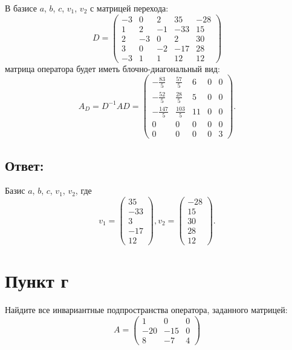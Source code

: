 \documentclass[12pt]{article}
\begin{document}
    В базисе $a$, $b$, $c$, $v_1$, $v_2$ с матрицей перехода:
    \[
        D
        =
        \begin{pmatrix}
            -3 & 0  & 2  & 35  & -28 \\
            1  & 2  & -1 & -33 & 15  \\
            2  & -3 & 0  & 2   & 30  \\
            3  & 0  & -2 & -17 & 28  \\
            -3 & 1  & 1  & 12  & 12
        \end{pmatrix}
    \]
    матрица оператора будет иметь блочно-диагональный вид:
    \[
        A_D
        = D^{-1} A D
        =
        \begin{pmatrix}
            - \frac{83}{5}  & \frac{57}{5}  & 6  & 0 & 0 \\
            - \frac{52}{5}  & \frac{28}{5}  & 5  & 0 & 0 \\
            - \frac{147}{5} & \frac{103}{5} & 11 & 0 & 0 \\
            0               & 0             & 0  & 0 & 0 \\
            0               & 0             & 0  & 0 & 3
        \end{pmatrix}
        .
    \]

    \subsection*{Ответ:}
    Базис $a$, $b$, $c$, $v_1$, $v_2$, где
    \[
        v_1 = \begin{pmatrix}
                  35 \\ -33 \\ 3 \\ -17 \\ 12
        \end{pmatrix} ,
        v_2 = \begin{pmatrix}
                  - 28 \\ 15 \\ 30 \\ 28 \\ 12
        \end{pmatrix} .
    \]

    \section*{Пункт г}
    Найдите все инвариантные подпространства оператора, заданного матрицей:
    \[
        A
        = \begin{pmatrix}
              1   & 0   & 0 \\
              -20 & -15 & 0 \\
              8   & -7  & 4
        \end{pmatrix}
    \]
\end{document}
